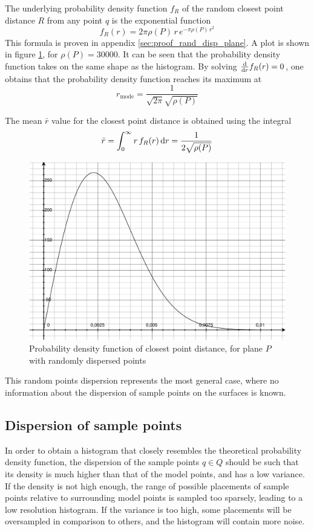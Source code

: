 The underlying probability density function $f_R$ of the random closest point distance $R$ from any point $q$ is the exponential function
\begin{equation}
f_R(r) = 2 \pi \rho(P) \, r \, e^{-\pi \rho(P) \, r^2}
\end{equation}
This formula is proven in appendix \ref{sec:proof_rand_disp_plane}. A plot is shown in figure \ref{fig:plane_rand_d}, for $\rho(P) = 30000$. It can be seen that the probability density function takes on the same shape as the histogram. By solving $\frac{\mathrm{d}}{\mathrm{d} r} f_R(r) = 0$, one obtains that the probability density function reaches its maximum at
\begin{equation}
r_{\text{mode}} = \frac{1}{\sqrt{2 \pi} \sqrt{\rho(P)}}
\end{equation}

The mean $\bar{r}$ value for the closest point distance is obtained using the integral
\begin{equation}
\bar{r} = \int_{0}^{\infty} r \, f_R(r) \, \mathrm{d} r = \frac{1}{2 \sqrt{\rho(P)}}
\end{equation}

\begin{figure}[p]
\centering
\includegraphics[width=.5\textwidth]{fig/plane_rand_d.pdf}
\caption{Probability density function of closest point distance, for plane $P$ with randomly dispersed points}
\label{fig:plane_rand_d}
\end{figure}

This random points dispersion represents the most general case, where no information about the dispersion of sample points on the surfaces is known. 



\subsection{Dispersion of sample points} \label{sec:disp_sample_pts}
In order to obtain a histogram that closely resembles the theoretical probability density function, the dispersion of the sample points $q \in Q$ should be such that its density is much higher than that of the model points, and has a low variance. If the density is not high enough, the range of possible placements of sample points relative to surrounding model points is sampled too sparsely, leading to a low resolution histogram. If the variance is too high, some placements will be oversampled in comparison to others, and the histogram will contain more noise.

